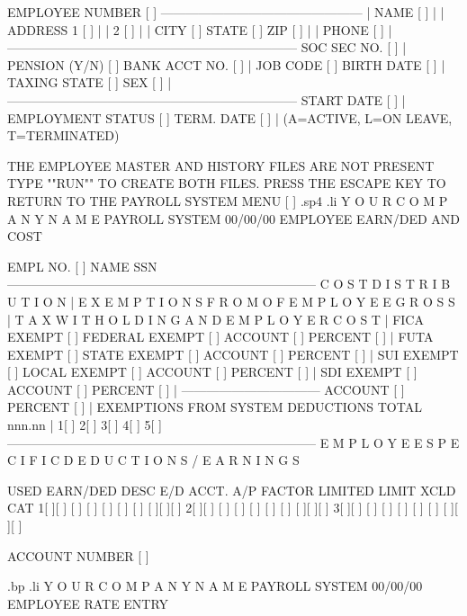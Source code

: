  EMPLOYEE NUMBER [     ] ------------------------------------------------
    |	  NAME		 [				]		|
    |	  ADDRESS     1  [				]		|
    |		      2  [				]		|
    |		  CITY	 [		    ]  STATE [	]  ZIP [     ]	|
    |		  PHONE  [	       ]				|
    ---------------------------------------------------------------------
    SOC SEC NO.   [	      ] 		 |    PENSION (Y/N)   [ ]
    BANK ACCT NO. [			    ]	 |    JOB CODE	    [	]
    BIRTH DATE	  [	   ]			 |    TAXING STATE   [	]
    SEX 	  [ ]				 |
    ---------------------------------------------------------------------
    START DATE [	]      |      EMPLOYMENT STATUS      [		]
    TERM. DATE [	]      |      (A=ACTIVE, L=ON LEAVE, T=TERMINATED)

	     THE EMPLOYEE MASTER AND HISTORY FILES ARE NOT PRESENT
	     TYPE  ""RUN"" TO CREATE BOTH FILES.    PRESS THE ESCAPE
	     KEY TO RETURN TO THE PAYROLL SYSTEM MENU [   ]
.sp4
.li
		 Y O U R   C O M P A N Y   N A M E
			  PAYROLL SYSTEM
  00/00/00	     EMPLOYEE EARN/DED AND COST

EMPL NO. [     ]    NAME				   SSN
 --------------------------------------------------------------------------
 C O S T   D I S T R I B U T I O N   |	  E X E M P T I O N S	F R O M
 O F   E M P L O Y E E	 G R O S S   |	   T A X    W I T H O L D I N G
 A N D	 E M P L O Y E R   C O S T   |	FICA EXEMPT [ ]  FEDERAL EXEMPT [ ]
 ACCOUNT [   ]	PERCENT  [	]    |	FUTA EXEMPT [ ]  STATE	 EXEMPT [ ]
 ACCOUNT [   ]	PERCENT  [	]    |	SUI  EXEMPT [ ]  LOCAL	 EXEMPT [ ]
 ACCOUNT [   ]	PERCENT  [	]    |	SDI  EXEMPT [ ]
 ACCOUNT [   ]	PERCENT  [	]    |	---------------------------------
 ACCOUNT [   ]	PERCENT  [	]    |	EXEMPTIONS FROM SYSTEM DEDUCTIONS
		TOTAL	  nnn.nn     |	   1[ ]  2[ ]  3[ ]  4[ ]  5[ ]
--------------------------------------------------------------------------
E M P L O Y E E   S P E C I F I C   D E D U C T I O N S / E A R N I N G S

USED  EARN/DED DESC   E/D ACCT. A/P   FACTOR   LIMITED	  LIMIT   XCLD CAT
1[ ][		    ] [ ] [   ] [ ] [	       ] [ ] [		  ][ ][  ]
2[ ][		    ] [ ] [   ] [ ] [	       ] [ ] [		  ][ ][  ]
3[ ][		    ] [ ] [   ] [ ] [	       ] [ ] [		  ][ ][  ]

			    ACCOUNT NUMBER [   ]

.bp
.li
		  Y O U R   C O M P A N Y   N A M E
			   PAYROLL SYSTEM
  00/00/00		 EMPLOYEE RATE ENTRY

